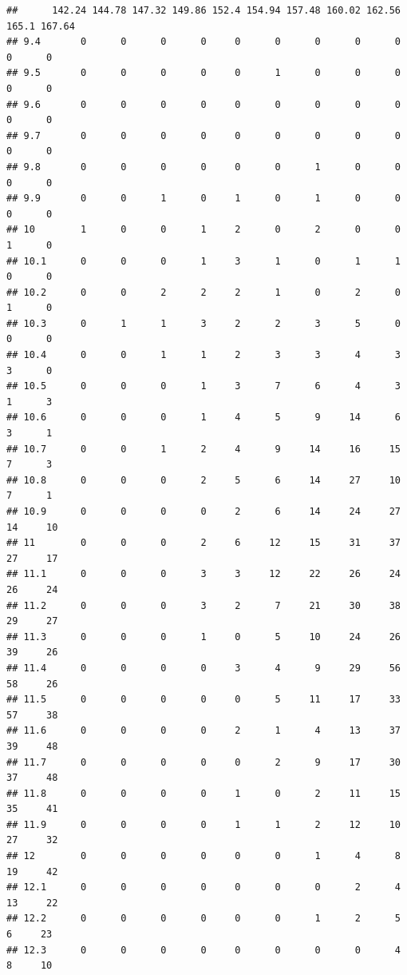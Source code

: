 \documentclass[
]{article}
\begin{document}
\begin{verbatim}
##      142.24 144.78 147.32 149.86 152.4 154.94 157.48 160.02 162.56 165.1 167.64
## 9.4       0      0      0      0     0      0      0      0      0     0      0
## 9.5       0      0      0      0     0      1      0      0      0     0      0
## 9.6       0      0      0      0     0      0      0      0      0     0      0
## 9.7       0      0      0      0     0      0      0      0      0     0      0
## 9.8       0      0      0      0     0      0      1      0      0     0      0
## 9.9       0      0      1      0     1      0      1      0      0     0      0
## 10        1      0      0      1     2      0      2      0      0     1      0
## 10.1      0      0      0      1     3      1      0      1      1     0      0
## 10.2      0      0      2      2     2      1      0      2      0     1      0
## 10.3      0      1      1      3     2      2      3      5      0     0      0
## 10.4      0      0      1      1     2      3      3      4      3     3      0
## 10.5      0      0      0      1     3      7      6      4      3     1      3
## 10.6      0      0      0      1     4      5      9     14      6     3      1
## 10.7      0      0      1      2     4      9     14     16     15     7      3
## 10.8      0      0      0      2     5      6     14     27     10     7      1
## 10.9      0      0      0      0     2      6     14     24     27    14     10
## 11        0      0      0      2     6     12     15     31     37    27     17
## 11.1      0      0      0      3     3     12     22     26     24    26     24
## 11.2      0      0      0      3     2      7     21     30     38    29     27
## 11.3      0      0      0      1     0      5     10     24     26    39     26
## 11.4      0      0      0      0     3      4      9     29     56    58     26
## 11.5      0      0      0      0     0      5     11     17     33    57     38
## 11.6      0      0      0      0     2      1      4     13     37    39     48
## 11.7      0      0      0      0     0      2      9     17     30    37     48
## 11.8      0      0      0      0     1      0      2     11     15    35     41
## 11.9      0      0      0      0     1      1      2     12     10    27     32
## 12        0      0      0      0     0      0      1      4      8    19     42
## 12.1      0      0      0      0     0      0      0      2      4    13     22
## 12.2      0      0      0      0     0      0      1      2      5     6     23
## 12.3      0      0      0      0     0      0      0      0      4     8     10

\end{verbatim}
\end{document}

